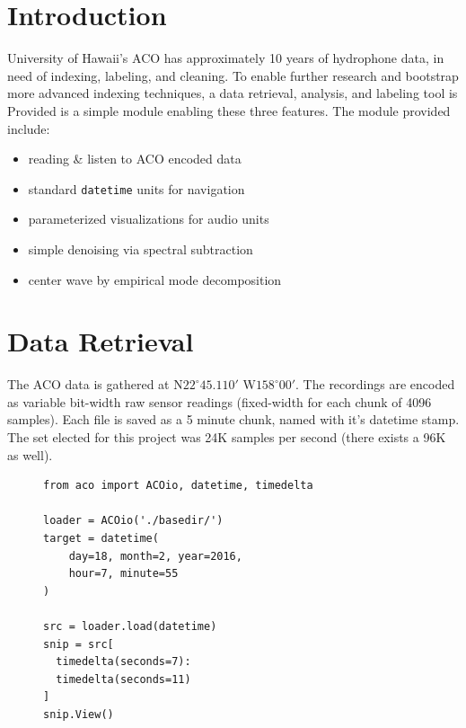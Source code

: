 \documentclass{article}
\begin{document}
\begin{multicols}{2}

\section{Introduction}

University of Hawaii's ACO has approximately 10 years of hydrophone data, in need of indexing, labeling, and cleaning. To enable further research and bootstrap more advanced indexing techniques, a data retrieval, analysis, and labeling tool is Provided is a simple module enabling these three features. The module provided include:

\begin{itemize}
    \setlength\itemsep{0em}
\item reading \& listen to ACO encoded data
\item standard \texttt{datetime} units for navigation
\item parameterized visualizations for audio units
\item simple denoising via spectral subtraction
\item center wave by empirical mode decomposition
\end{itemize}

\section{Data Retrieval}

The ACO data is gathered at N$22^\circ45.110'$ W$158^\circ00'$.
The recordings are encoded as variable bit-width raw sensor readings (fixed-width for each chunk of 4096 samples). Each file is saved as a 5 minute chunk, named with it's datetime stamp. The set elected for this project was 24K samples per second (there exists a 96K as well).


\begin{figure}[H]
  \centering

\begin{lstlisting}
from aco import ACOio, datetime, timedelta

loader = ACOio('./basedir/')
target = datetime(
    day=18, month=2, year=2016,
    hour=7, minute=55
)

src = loader.load(datetime)
snip = src[
  timedelta(seconds=7):
  timedelta(seconds=11)
]
snip.View()
\end{lstlisting}


\end{figure}
\end{multicols}
\end{document}
